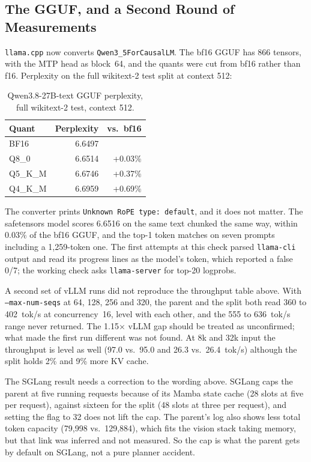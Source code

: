 \documentclass[11pt]{article}
\begin{document}
\subsection{The GGUF, and a Second Round of Measurements}
\label{sec:qwen-gguf}

\texttt{llama.cpp} now converts \texttt{Qwen3\_5ForCausalLM}. The bf16 GGUF has 866
tensors, with the MTP head as block~64, and the quants were cut from bf16 rather than f16.
Perplexity on the full wikitext-2 test split at context 512:

\begin{table}[h]
\centering
\small
\begin{tabular}{lrr}
\toprule
Quant & Perplexity & vs.\ bf16 \\
\midrule
BF16 & 6.6497 & \\
Q8\_0 & 6.6514 & +0.03\% \\
Q5\_K\_M & 6.6746 & +0.37\% \\
Q4\_K\_M & 6.6959 & +0.69\% \\
\bottomrule
\end{tabular}
\caption{Qwen3.8-27B-text GGUF perplexity, full wikitext-2 test, context 512.}
\end{table}

The converter prints \texttt{Unknown RoPE type: default}, and it does not matter. The
safetensors model scores 6.6516 on the same text chunked the same way, within 0.03\% of the
bf16 GGUF, and the top-1 token matches on seven prompts including a 1{,}259-token one.
The first attempts at this check parsed \texttt{llama-cli} output and read its progress
lines as the model's token, which reported a false 0/7; the working check asks
\texttt{llama-server} for top-20 logprobs.

A second set of vLLM runs did not reproduce the throughput table above. With \texttt{--max-num-seqs} at
64, 128, 256 and 320, the parent and the split both read 360 to 402~tok/s at
concurrency~16, level with each other, and the 555 to 636~tok/s range never returned. The
1.15$\times$ vLLM gap should be treated as unconfirmed; what made the first run different
was not found. At 8k and 32k input the throughput is level as well (97.0 vs.\ 95.0 and 26.3
vs.\ 26.4~tok/s) although the split holds 2\% and 9\% more KV cache.

The SGLang result needs a correction to the wording above. SGLang caps the parent at five
running requests because of its Mamba state cache (28 slots at five per request), against
sixteen for the split (48 slots at three per request), and setting the flag to 32 does not
lift the cap. The parent's log also shows less total token capacity (79{,}998 vs.\
129{,}884), which fits the vision stack taking memory, but that link was inferred and not
measured. So the cap is what the parent gets by default on SGLang, not a pure planner
accident.
\end{document}
